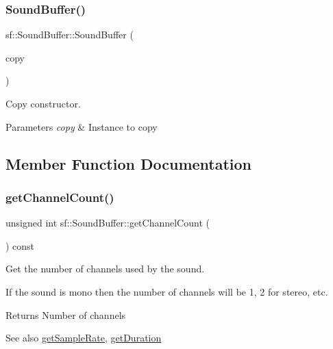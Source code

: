 \subsubsection{\texorpdfstring{Sound\+Buffer()}{SoundBuffer()}}
{\footnotesize\ttfamily sf\+::\+Sound\+Buffer\+::\+Sound\+Buffer (\begin{DoxyParamCaption}\item[{const \hyperlink{classsf_1_1_sound_buffer}{Sound\+Buffer} \&}]{copy }\end{DoxyParamCaption})}



Copy constructor. 


\begin{DoxyParams}{Parameters}
{\em copy} & Instance to copy \\
\hline
\end{DoxyParams}


\subsection{Member Function Documentation}
\mbox{\label{classsf_1_1_sound_buffer_a127707b831d875ed790eef1aa2b9fcc3}} 
\subsubsection{\texorpdfstring{get\+Channel\+Count()}{getChannelCount()}}
{\footnotesize\ttfamily unsigned int sf\+::\+Sound\+Buffer\+::get\+Channel\+Count (\begin{DoxyParamCaption}{ }\end{DoxyParamCaption}) const}



Get the number of channels used by the sound. 

If the sound is mono then the number of channels will be 1, 2 for stereo, etc.

\begin{DoxyReturn}{Returns}
Number of channels
\end{DoxyReturn}
\begin{DoxySeeAlso}{See also}
\hyperlink{classsf_1_1_sound_buffer_a2c2cf0078ce0549246ecc4a1646212b4}{get\+Sample\+Rate}, \hyperlink{classsf_1_1_sound_buffer_a280a581d9b360fd16121714c51fc8261}{get\+Duration} 
\end{DoxySeeAlso}
\mbox{\label{classsf_1_1_sound_buffer_a280a581d9b360fd16121714c51fc8261}} 
